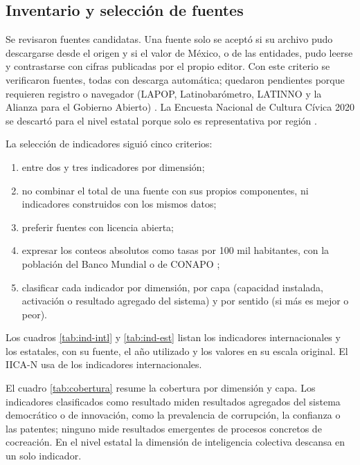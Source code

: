 \documentclass[11pt,a4paper]{article}
\begin{document}
\subsection{Inventario y selección de fuentes}

Se revisaron \NFuentesTotal{} fuentes candidatas. Una fuente solo se aceptó si su archivo pudo descargarse desde el origen y si el valor de México, o de las entidades, pudo leerse y contrastarse con cifras publicadas por el propio editor. Con este criterio se verificaron \NFuentesVerificadas{} fuentes, todas con descarga automática; \NFuentesCandidatas{} quedaron pendientes porque requieren registro o navegador (LAPOP, Latinobarómetro, LATINNO y la Alianza para el Gobierno Abierto) \parencite{lapop_americasbarometer,latinobarometro2026,pogrebinschi_latinno2021,ogp_datos}. La Encuesta Nacional de Cultura Cívica 2020 se descartó para el nivel estatal porque solo es representativa por región \parencite{inegi_encuci_2020}.

La selección de indicadores siguió cinco criterios:
\begin{enumerate}
  \item entre dos y tres indicadores por dimensión;
  \item no combinar el total de una fuente con sus propios componentes, ni indicadores construidos con los mismos datos;
  \item preferir fuentes con licencia abierta;
  \item expresar los conteos absolutos como tasas por 100 mil habitantes, con la población del Banco Mundial \parencite{bancomundial_wdi} o de CONAPO \parencite{conapo_proyecciones_2023};
  \item clasificar cada indicador por dimensión, por capa (capacidad instalada, activación o resultado agregado del sistema) y por sentido (si más es mejor o peor).
\end{enumerate}
Los cuadros \ref{tab:ind-intl} y \ref{tab:ind-est} listan los \NIndIntl{} indicadores internacionales y los \NIndEst{} estatales, con su fuente, el año utilizado y los valores en su escala original. El IICA-N usa \NIndNac{} de los indicadores internacionales.




El cuadro \ref{tab:cobertura} resume la cobertura por dimensión y capa. Los indicadores clasificados como resultado miden resultados agregados del sistema democrático o de innovación, como la prevalencia de corrupción, la confianza o las patentes; ninguno mide resultados emergentes de procesos concretos de cocreación. En el nivel estatal la dimensión de inteligencia colectiva descansa en un solo indicador.
\end{document}
